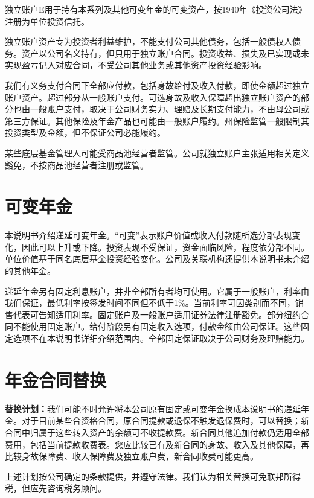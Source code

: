 \documentclass[UTF8,fontset=none,11pt,a4paper]{ctexart}
\begin{document}
独立账户E用于持有本系列及其他可变年金的可变资产，按1940年《投资公司法》注册为单位\allowbreak\mbox{投资信托。}


独立账户资产专为投资者利益维护，不能支付公司其他债务，包括一般债权人债务。资产以公司名义持有，但只用于独立账户合同。投资收益、损失及已实现或未实现盈亏记入对应合同，不受公司其他业务或其他资产投资\allowbreak\mbox{经验影响。}


我们有义务支付合同下全部应付款，包括身故给付及收入付款，即使金额超过独立账户资产。超过部分从一般账户支付。可选身故及收入保障超出独立账户资产的部分也由一般账户支付，取决于公司财务实力、理赔及长期支付能力，不由母公司或第三方保证。其他保险及年金产品也可能由一般账户履约。州保险监管一般限制其投资类型及金额，但不保证公司\allowbreak\mbox{必能履约。}


某些底层基金管理人可能受商品池经营者监管。公司就独立账户主张适用相关定义豁免，不按商品池经营者注\allowbreak\mbox{册或监管。}


\section*{可变年金}
本说明书介绍递延可变年金。“可变”表示账户价值或收入付款随所选分部表现变化，因此可以上升或下降。投资表现不受保证，资金面临风险，程度依分部不同。单位价值基于同名底层基金投资经验变化。公司及关联机构还提供本说明书未介绍的\allowbreak\mbox{其他年金。}


递延年金另有固定利息账户，并非全部所有者均可使用。它属于一般账户，利率由我们保证，最低利率按签发时间不同但不低于1\%。当前利率可因类别而不同，销售代表可告知适用利率。固定账户及一般账户适用证券法律注册豁免。部分纽约合同不能使用固定账户。给付阶段另有固定收入选项，付款金额由公司保证。这些固定选项不在本说明书详细介绍范围内。全部固定保证取决于公司财务及\allowbreak\mbox{理赔能力。}


\section*{年金合同替换}
\textbf{替换计划：}我们可能不时允许将本公司原有固定或可变年金换成本说明书的递延年金。对于目前某些合资格合同，原合同提款或退保不触发退保费时，可以替换；新合同中归属于这些转入资产的余额可不收提款费。新合同其他追加付款仍适用全部费用，包括当前提款收费表。您应比较已有及新合同的身故、收入及其他保障，再比较身故保障费、收入保障费及独立账户费，新合同收费\allowbreak\mbox{可能更高。}


上述计划按公司确定的条款提供，并遵守法律。我们认为相关替换可免联邦所得税，但应先咨询\allowbreak\mbox{税务顾问。}
\end{document}
